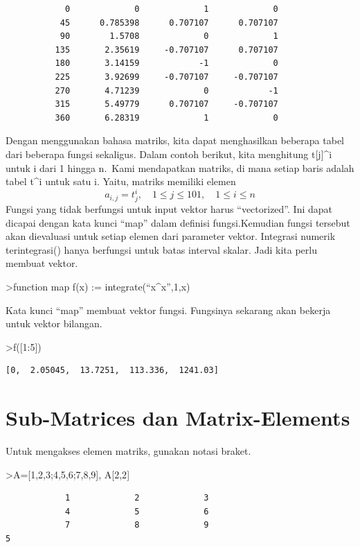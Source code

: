 \documentclass[
]{book}
\begin{document}
\begin{verbatim}
            0             0             1             0 
           45      0.785398      0.707107      0.707107 
           90        1.5708             0             1 
          135       2.35619     -0.707107      0.707107 
          180       3.14159            -1             0 
          225       3.92699     -0.707107     -0.707107 
          270       4.71239             0            -1 
          315       5.49779      0.707107     -0.707107 
          360       6.28319             1             0 
\end{verbatim}

Dengan menggunakan bahasa matriks, kita dapat menghasilkan beberapa tabel dari beberapa fungsi sekaligus. Dalam contoh berikut, kita menghitung t{[}j{]}\^{}i untuk i dari 1 hingga n.~Kami mendapatkan matriks, di mana setiap baris adalah tabel t\^{}i untuk satu i. Yaitu, matriks memiliki elemen \[a_{i,j} = t_j^i, \quad 1 \le j \le 101, \quad 1 \le i \le n\]Fungsi yang tidak berfungsi untuk input vektor harus ``vectorized''. Ini dapat dicapai dengan kata kunci ``map'' dalam definisi fungsi.Kemudian fungsi tersebut akan dievaluasi untuk setiap elemen dari parameter vektor. Integrasi numerik terintegrasi() hanya berfungsi untuk batas interval skalar. Jadi kita perlu membuat vektor.

\textgreater function map f(x) := integrate(``x\^{}x'',1,x)

Kata kunci ``map'' membuat vektor fungsi. Fungsinya sekarang akan bekerja untuk vektor bilangan.

\textgreater f({[}1:5{]})

\begin{verbatim}
[0,  2.05045,  13.7251,  113.336,  1241.03]
\end{verbatim}

\section{Sub-Matrices dan Matrix-Elements}\label{sub-matrices-dan-matrix-elements}

Untuk mengakses elemen matriks, gunakan notasi braket.

\textgreater A={[}1,2,3;4,5,6;7,8,9{]}, A{[}2,2{]}

\begin{verbatim}
            1             2             3 
            4             5             6 
            7             8             9 
5
\end{verbatim}
\end{document}
